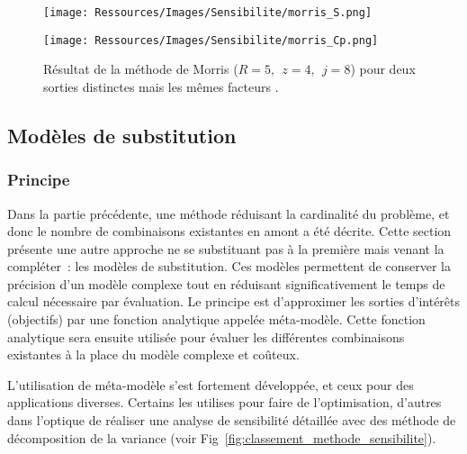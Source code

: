 \begin{figure}
    \centering
    \begin{minipage}{.45\textwidth}
      \texttt{[image: Ressources/Images/Sensibilite/morris\_S.png]}
    \end{minipage}
    \hfill
    \begin{minipage}{.45\textwidth}
      \texttt{[image: Ressources/Images/Sensibilite/morris\_Cp.png]}
    \end{minipage}
  \caption[Exemple de résultats de la méthode de Morris]
          {Résultat de la méthode de Morris ($R = 5,~~ z = 4,~~ j=8$) pour deux
           sorties distinctes mais les mêmes facteurs \parencite{Iooss2011}.}
  \label{fig:meth_graph_morris}
\end{figure}



\subsection{Modèles de substitution} %
\label{sub:modeles_de_substitution}
\subsubsection{Principe} %
\label{ssub:principe}
Dans la partie précédente, une méthode réduisant la cardinalité du problème, et donc le
nombre de combinaisons existantes en amont a été décrite. Cette section présente une autre
approche ne se substituant pas à la première mais venant la compléter~: les modèles de
substitution. Ces modèles permettent de conserver la précision d’un modèle complexe tout
en réduisant significativement le temps de calcul nécessaire par évaluation. Le principe
est d’approximer les sorties d’intérêts (objectifs) par une fonction analytique appelée
méta-modèle. Cette fonction analytique sera ensuite utilisée pour évaluer les différentes
combinaisons existantes à la place du modèle complexe et coûteux.

L’utilisation de méta-modèle s’est fortement développée, et ceux pour des
applications diverses. Certains les utilises pour faire de l’optimisation,
d’autres dans l’optique de réaliser une analyse de sensibilité détaillée avec des
méthode de décomposition de la variance (voir Fig~\ref{fig:classement_methode_sensibilite}).


